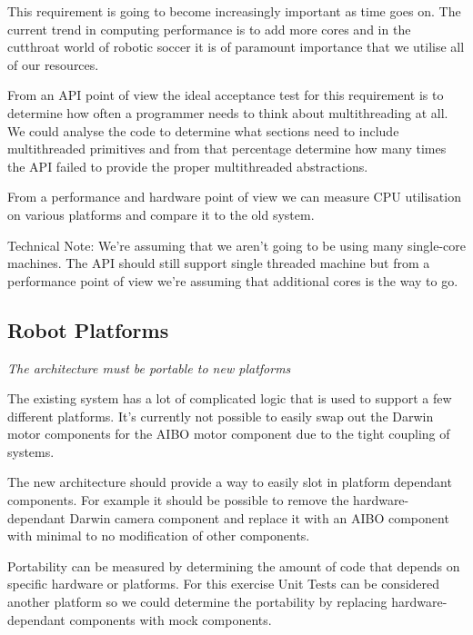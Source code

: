 \documentclass[english,12pt]{scrartcl}
\newcommand{\requirement}[1]{\textit{#1}}
\begin{document}
            This requirement is going to become increasingly important as time goes on. The current
            trend in computing performance is to add more cores and in the cutthroat world of
            robotic soccer it is of paramount importance that we utilise all of our resources.
            
            From an API point of view the ideal acceptance test for this requirement is to determine 
            how often a programmer needs to think about multithreading at all. We could analyse the
            code to determine what sections need to include multithreaded primitives and from that
            percentage determine how many times the API failed to provide the proper multithreaded
            abstractions.
            
            From a performance and hardware point of view we can measure CPU utilisation on various
            platforms and compare it to the old system.
            
            Technical Note: We're assuming that we aren't going to be using many single-core
            machines. The API should still support single threaded machine but from a performance
            point of view we're assuming that additional cores is the way to go.

        \subsection{Robot Platforms}
            \requirement{The architecture must be portable to new platforms}
            
            The existing system has a lot of complicated logic that is used to support a few
            different platforms. It's currently not possible to easily swap out the Darwin motor
            components for the AIBO motor component due to the tight coupling of systems.
            
            The new architecture should provide a way to easily slot in platform dependant
            components. For example it should be possible to remove the hardware-dependant Darwin
            camera component and replace it with an AIBO component with minimal to no modification
            of other components.
            
            Portability can be measured by determining the amount of code that depends on specific
            hardware or platforms. For this exercise Unit Tests can be considered another platform
            so we could determine the portability by replacing hardware-dependant components with
            mock components. 
            
\end{document}
